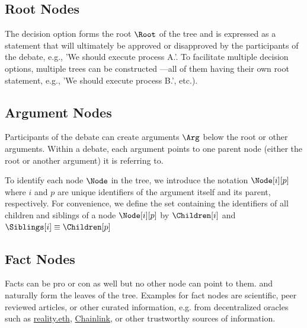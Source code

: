 \documentclass[%
aip,
amsmath,amssymb,
reprint,%
unsortedaddress,
nofootinbib
]{revtex4-2}
\begin{document}
\subsection{Root Nodes}
The decision option forms the root $\Root$ of the tree and is expressed as a statement that will ultimately be
approved 
or 
disapproved 
by the participants of the debate, e.g., 'We should execute process A.'. 
%
To facilitate multiple decision options, multiple trees can be constructed%
---all of them having their own root statement, e.g., 'We should execute process B.', etc.).

\subsection{Argument Nodes}
Participants of the debate can create arguments $\Arg$ below the root
or other arguments. 
%
Within a debate, each argument points to one parent node (either the root or another argument) it is referring to. 


To identify each node $\Node$ in the tree, we introduce the notation $\Node[i][p]$
where $i$ and $p$ are unique identifiers of the argument itself and its parent, respectively.
For convenience, we define the set containing the identifiers of all children and siblings of a node $\Node[i][p]$ by $\Children[i]$ and $\Siblings[i]\equiv\Children[p]$


\subsection{Fact Nodes}
Facts can be pro or con as well but no other node can point to them. 
and naturally form the leaves of the tree.
%
Examples for fact nodes are scientific, peer reviewed articles,
or other curated information, e.g. from decentralized oracles such as \href{https://reality.eth.link/}{reality.eth}, \href{https://chain.link/}{Chainlink}, or other trustworthy sources of information.
\end{document}
